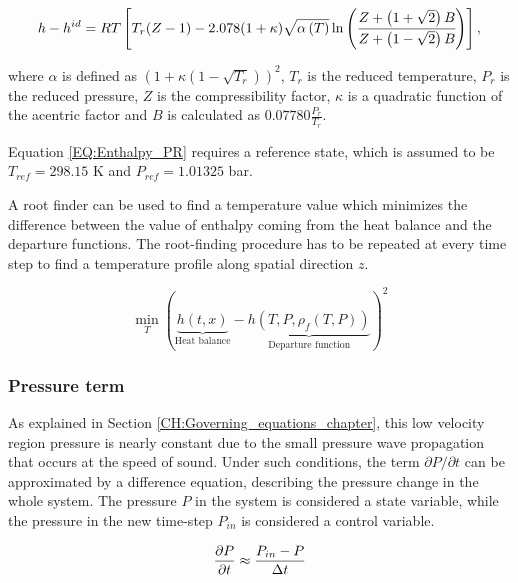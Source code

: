 \documentclass[a4paper,fleqn]{cas-dc}
\begin{document}
	{\scriptsize
		\begin{equation}
			{\color{black}h}-{\color{black}h}^{id}={\color{black}R}T \left[{\color{black}T_r}({\color{black}Z}-1) -2.078(1+{\color{black}\kappa} ){\sqrt { {\color{black}\alpha}\left(T\right) } } \ln \left(\cfrac{{\color{black}Z}+\left( 1+\sqrt{2} \right){\color{black}B}}{{\color{black}Z}+\left( 1-\sqrt{2} \right){\color{black}B}}\right)\right],
			\label{EQ:Enthalpy_PR}
		\end{equation}				
	}
	
	where $\alpha$ is defined as $\left( 1+\kappa \left( 1 - \sqrt{T_r} \right) \right)^2$, $T_r$ is the reduced temperature, $P_r$ is the reduced pressure, $Z$ is the compressibility factor, $\kappa$ is a quadratic function of the acentric factor and $B$ is calculated as $0.07780\frac{P_r}{T_r}$.
	
	Equation \ref{EQ:Enthalpy_PR} requires a reference state, which is assumed to be $T_{ref}=298.15$ K and $P_{ref}=1.01325$ bar.
	
	A root finder can be used to find a temperature value which minimizes the difference between the value of enthalpy coming from the heat balance and the departure functions. The root-finding procedure has to be repeated at every time step to find a temperature profile along spatial direction $z$.
	
	{\footnotesize
		\begin{equation}
			\min_T \left( \underbrace{h\left(t,x\right)}_{\text{Heat balance}} - \underbrace{h\left(T,P,\rho_f\left(T,P\right)\right)}_{\text{Departure function}} \right)^2
			\label{EQ:Enthalpy_root}
		\end{equation}
	}
	
	\subsubsection{Pressure term} \label{CH: Pressure}
	
	As explained in Section \ref{CH:Governing_equations_chapter}, this low velocity region pressure is nearly constant due to the small pressure wave propagation that occurs at the speed of sound. Under such conditions, the term $\partial P/\partial t$ can be approximated by a difference equation, describing the pressure change in the whole system. The pressure $P$ in the system is considered a state variable, while the pressure in the new time-step $P_{in}$ is considered a control variable.
	
	{\footnotesize
		\begin{equation}
			\frac{\partial {\color{black}P}}{\partial t} \approx \frac{{\color{black}P_{in}} - {\color{black}P} }{\Delta t}
	\end{equation}}
	
\end{document}
